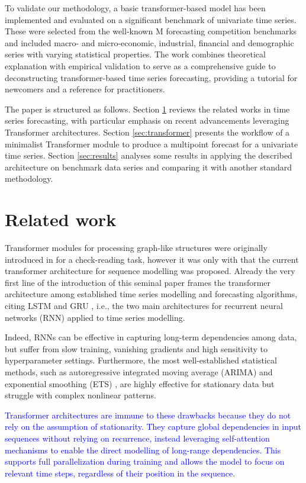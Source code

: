 \documentclass[algorithms,article,submit,pdftex,moreauthors]{Definitions/mdpi}
\begin{document}
To validate our methodology, a basic transformer-based model has been implemented and evaluated on a significant benchmark of univariate time series. These were selected from the well-known M forecasting competition benchmarks and included macro- and micro-economic, industrial, financial and demographic series with varying statistical properties. The work combines theoretical explanation with empirical validation to serve as a comprehensive guide to deconstructing transformer-based time series forecasting, providing a tutorial for newcomers and a reference for practitioners.

The paper is structured as follows. Section \ref{sec:literature} reviews the related works in time series forecasting, with particular emphasis on recent advancements leveraging Transformer architectures. Section \ref{sec:transformer} presents the workflow of a minimalist Transformer module to produce a multipoint forecast for a univariate time series. Section \ref{sec:results} analyses some results in applying the described architecture on benchmark data series and comparing it with another standard methodology.

\section{Related work} \label{sec:literature}

Transformer modules for processing graph-like structures were originally introduced in \citep{LBB97} for a check-reading task, however it was only with \citep{VSPU17} that the current transformer architecture for sequence modelling was proposed. Already the very first line of the introduction of this seminal paper frames the transformer architecture among established time series modelling and forecasting algorithms, citing LSTM \citep{HS97} and GRU \citep{ CGCB14}, i.e., the two main architectures for recurrent neural networks (RNN) applied to time series modelling.

Indeed, RNNs can be effective in capturing long-term dependencies among data, but suffer from slow training, vanishing gradients and high sensitivity to hyperparameter settings. Furthermore, the most well-established statistical methods, such as autoregressive integrated moving average (ARIMA) \citep{BJ70} and exponential smoothing (ETS) \citep{H57,W60}, are highly effective for stationary data but struggle with complex nonlinear patterns.

\textcolor{blue}{Transformer architectures are immune to these drawbacks because they do not rely on the assumption of stationarity. They capture global dependencies in input sequences without relying on recurrence, instead leveraging self-attention mechanisms to enable the direct modelling of long-range dependencies. This supports full parallelization during training and allows the model to focus on relevant time steps, regardless of their position in the sequence}.
\end{document}
